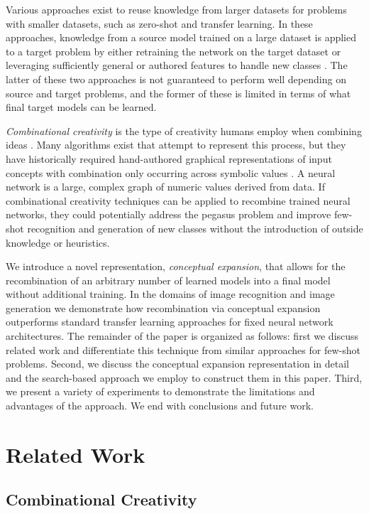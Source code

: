 \documentclass[letterpaper]{article}
\begin{document}
Various approaches exist to reuse knowledge from larger datasets for problems with smaller datasets, such as zero-shot and transfer learning. 
In these approaches, knowledge from a source model trained on a large dataset is applied to a target problem by either retraining the network on the target dataset \cite{levy2012teaching} or leveraging sufficiently general or authored features to handle new classes \cite{xian2017zero}. 
The latter of these two approaches is not guaranteed to perform well depending on source and target problems, and the former of these is limited in terms of what final target models can be learned.

{\em Combinational creativity} 
is
the type of creativity humans employ when combining ideas \cite{boden2004creative}. Many algorithms exist that attempt to represent this process, but they have historically required hand-authored graphical representations of input concepts with combination only occurring across symbolic values \cite{fauconnier2001conceptual}. 
A neural network is a large, complex graph of numeric values derived from data.
If combinational creativity techniques can be applied to recombine trained neural networks, they could potentially address the pegasus problem and improve few-shot recognition and generation of new classes without the introduction of outside knowledge or heuristics.

We introduce a novel representation, \textit{conceptual expansion}, that allows for the recombination of an arbitrary number of learned models into a final model without additional training.
In the domains of image recognition and image generation we demonstrate how recombination via conceptual expansion outperforms standard transfer learning approaches for fixed neural network architectures. 
The remainder of the paper is organized as follows: first we discuss related work and differentiate this technique from similar approaches for few-shot problems. Second, we discuss the conceptual expansion representation in detail and the search-based approach we employ to construct them in this paper. Third, we present a variety of experiments to demonstrate the limitations and advantages of the approach. We end with conclusions and future work.

\section{Related Work}

\subsection{Combinational Creativity}
\end{document}
